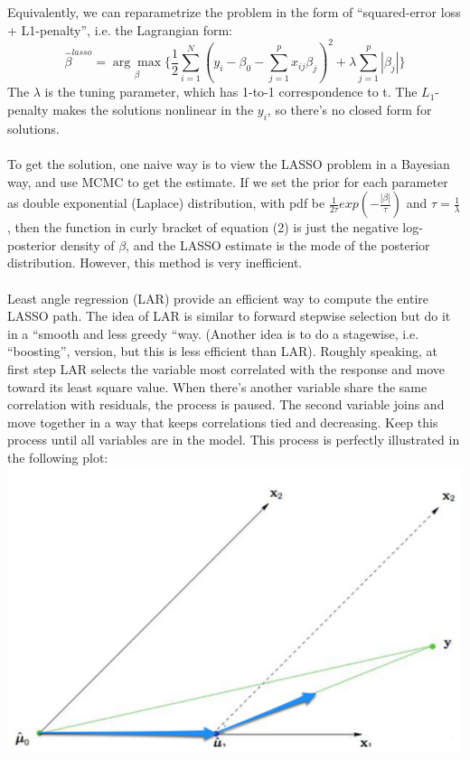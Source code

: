 \documentclass[]{article}
\begin{document}
Equivalently, we can reparametrize the problem in the form of “squared-error loss + L1-penalty”, i.e. the Lagrangian form:
\begin{equation}
	\hat{\beta}^{lasso} = \underset{\beta}{\arg\max}\{   \frac{1}{2}\sum_{i=1}^{N}(y_i-\beta_0-\sum_{j=1}^{p}x_{ij}\beta_j)^2 + \lambda\sum_{j=1}^{p}|\beta_j|\}
\end{equation}
The $\lambda$ is the tuning parameter, which has 1-to-1 correspondence to t. The $L_1$-penalty makes the solutions nonlinear in the $y_i$, so there’s no closed form for solutions.\\
\\
To get the solution, one naive way is to view the LASSO problem in a Bayesian way, and use MCMC to get the estimate. If we set the prior for each parameter as double exponential (Laplace) distribution, with pdf be $\frac{1}{2\tau}exp(-\frac{|\beta|}{\tau})$ and $\tau=\frac{1}{\lambda}$, then the function in curly bracket of equation (2) is just the negative log-posterior density of $\beta$, and the LASSO estimate is the mode of the posterior distribution. However, this method is very inefficient.\\
\\
Least angle regression (LAR) provide an efficient way to compute the entire LASSO path. The idea of LAR is similar to forward stepwise selection but do it in a “smooth and less greedy “way. (Another idea is to do a stagewise, i.e. “boosting”, version, but this is less efficient than LAR). Roughly speaking, at first step LAR selects the variable most correlated with the response and move toward its least square value. When there’s another variable share the same correlation with residuals, the process is paused. The second variable joins and move together in a way that keeps correlations tied and decreasing. Keep this process until all variables are in the model. This process is perfectly illustrated in the following plot:\\
\includegraphics[width = .7\textwidth]{LAR.png}\\
\end{document}
